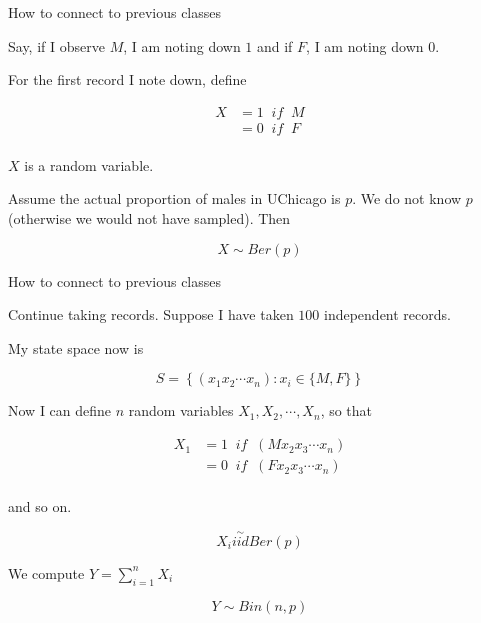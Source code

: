 \documentclass{beamer}\usepackage[]{graphicx}\usepackage[]{color}
\begin{document}
\begin{frame}[fragile]{How to connect to previous classes \;\;}

Say, if I observe $M$, I am noting down $1$ and if $F$, I am noting down $0$. \pause \newline

For the first record I note down, define

\begin{align}
X & = 1 \;\; if \;\; M \\
  & = 0 \;\; if \;\; F \\
\end{align}

$X$ is a random variable. \pause \newline

Assume the actual proportion of males in UChicago is $p$. We do not know $p$ (otherwise we would not have sampled). Then

$$  X \sim Ber(p)  $$ \pause \newline


\end{frame}

\begin{frame}[fragile]{How to connect to previous classes \;\;}

Continue taking records. Suppose I have taken $100$ independent records.\pause \newline

My state space now is

$$ S = \left \{ (x_1 x_2 \cdots x_n) :  x_i \in \{ M, F \} \right \}  $$ \pause \newline

Now I can define $n$ random variables $X_1, X_2, \cdots, X_n$, so that

\begin{align}
X_1 & = 1 \;\; if \;\; (M x_2 x_3 \cdots x_n) \\
  & = 0 \;\; if \;\;  (F x_2 x_3 \cdots x_n) \\
\end{align}

and so on. \pause \newline

$$ X_{i} \stackrel{\sim}{iid} Ber (p)  $$ \pause \newline

We compute $Y= \sum_{i=1}^{n} X_{i}$

$$ Y \sim Bin(n,p) $$

\end{frame}
\end{document}
